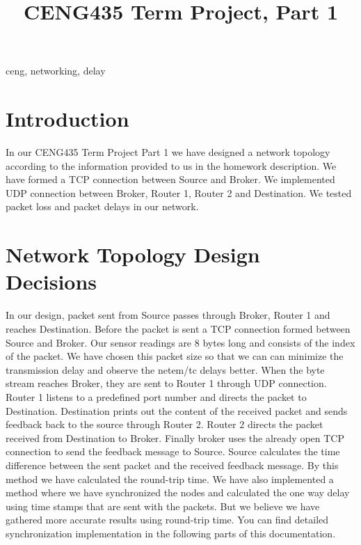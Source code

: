 \documentclass[conference]{IEEEtran}
\begin{document}
\title{CENG435 Term Project, Part 1\\
}

\author{
\IEEEauthorblockA{
}
\and
{}
\IEEEauthorblockA{
}
}

\maketitle

\begin{abstract}
\end{abstract}

\begin{IEEEkeywords}
ceng, networking, delay
\end{IEEEkeywords}

\section{Introduction}

In our CENG435 Term Project Part 1 we have designed a network topology according to the information provided to us in the homework description. We have formed a TCP connection between Source and Broker. We implemented UDP connection between Broker, Router 1, Router 2 and Destination. We tested packet loss and packet delays in our network.

\section{Network Topology Design Decisions}

In our design, packet sent from Source passes through Broker, Router 1 and reaches Destination. Before the packet is sent a TCP connection formed between Source and Broker. Our sensor readings are 8 bytes long and consists of the index of the packet. We have chosen this packet size so that we can can minimize the transmission delay and observe the netem/tc delays better. When the byte stream reaches Broker, they are sent to Router 1 through UDP connection. Router 1 listens to a predefined port number and directs the packet to Destination. Destination prints out the content of the received packet and sends feedback back to the source through Router 2. Router 2 directs the packet received from Destination to Broker. Finally broker uses the already open TCP connection to send the feedback message to Source. Source calculates the time difference between the sent packet and the received feedback message. By this method we have calculated the round-trip time. We have also implemented a method where we have synchronized the nodes and calculated the one way delay using time stamps that are sent with the packets. But we believe we have gathered more accurate results using round-trip time. You can find detailed synchronization implementation in the following parts of this documentation.
\end{document}
